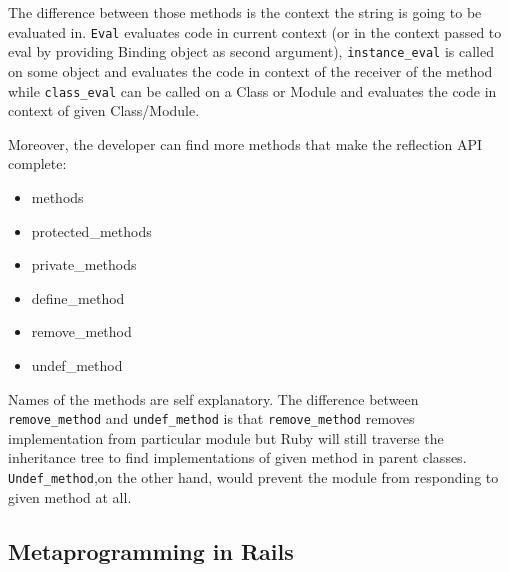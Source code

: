       The difference between those methods is the context the string is going to be evaluated in. 
      \texttt{Eval} evaluates code in current context (or in the context passed to eval by providing
      Binding object as second argument), \texttt{instance\_eval} is called on some object and evaluates
      the code in context of the receiver of the method while \texttt{class\_eval} can be called on a 
      Class or Module and evaluates the code in context of given Class/Module.
      
      Moreover, the developer can find more methods that make the reflection API complete:
      
        \begin{itemize}
          \item{methods}
          \item{protected\_methods}
          \item{private\_methods}
          \item{define\_method}
          \item{remove\_method}
          \item{undef\_method}
        \end{itemize}
      
      Names of the methods are self explanatory. The difference between \texttt{remove\_method}  and
      \texttt{undef\_method} is that \texttt{remove\_method} removes implementation from particular module 
      but Ruby will still traverse the inheritance tree to find implementations of given method in parent
      classes. \texttt{Undef\_method},on the other hand, would prevent the module from responding to given
      method at all.
      
    \subsection{Metaprogramming in Rails}
      
    
      
      
      
      
        
      
      
      
      